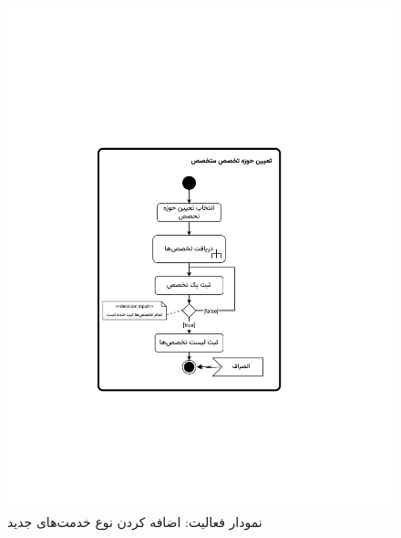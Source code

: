 \begin{figure}[ht!]
	\centering
	\includegraphics[scale=0.8, page=2]{figs/OOD-activity21-30.pdf}
	\caption{نمودار فعالیت: اضافه کردن نوع خدمت‌های جدید}
\end{figure}
\FloatBarrier
\newpage

